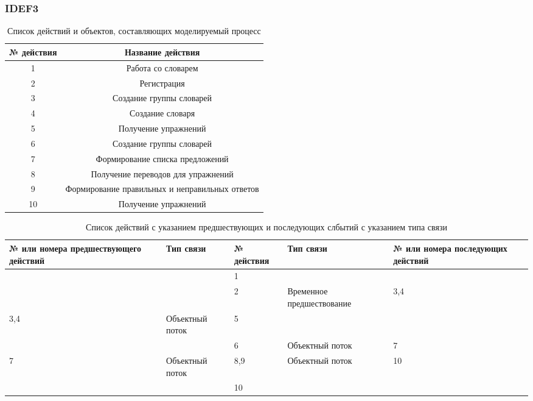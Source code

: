 \documentclass[a4paper,14pt]{extarticle}
\begin{document}
\subsubsection{IDEF3}
\begin{table}[H]
    \caption{Список действий и объектов, составляющих моделируемый процесс}
    \begin{tabular}{| c | c |}
        \hline
        № действия & Название действия \\ \hline
        1 & Работа со словарем \\ \hline
        2 & Регистрация \\ \hline
        3 & Создание группы словарей \\ \hline
        4 & Создание словаря \\ \hline
        5 & Получение упражнений \\ \hline
        6 & Создание группы словарей \\ \hline
        7 & Формирование списка предложений \\ \hline
        8 & Получение переводов для упражнений \\ \hline
        9 & Формирование правильных и неправильных ответов \\ \hline
        10 & Получение упражнений \\ \hline
    \end{tabular}
\end{table}

\begin{table}[H]
    \caption{Список действий с указанием предшествующих и последующих слбытий с указанием типа связи}
    \begin{tabular}{| p{3cm} | p{3cm} | p{3cm} | p{3cm} | p{3cm} |}
        \hline
        № или номера предшествующего действий & Тип связи & № действия & Тип связи & № или номера последующих действий \\ \hline
         & & 1 & & \\ \hline
         & & 2 & Временное предшествование & 3,4 \\ \hline
         3,4 & Объектный поток & 5 & & \\ \hline
         & & 6 & Объектный поток & 7 \\ \hline
         7 & Объектный поток & 8,9 & Объектный поток & 10 \\ \hline
         & & 10 & & \\ \hline
    \end{tabular}
\end{table}
\end{document}

